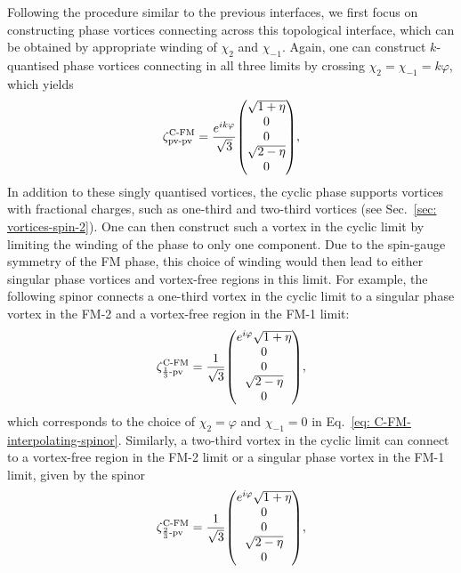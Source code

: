 Following the procedure similar to the previous interfaces, we first focus on
constructing phase vortices connecting across this topological interface, which
can be obtained by appropriate winding of \(\chi_2\) and \(\chi_{-1}\).
Again, one can construct \(k\)-quantised phase vortices connecting in all three
limits by crossing \(\chi_2 = \chi_{-1} = k\varphi \), which yields
\begin{align}\label{eq: C-FM-pv-pv}
    \zeta^\text{C-FM}_\text{pv-pv} = \frac{e^{ik\varphi}}{\sqrt{3}}\mqty(
        \sqrt{1 + \eta} \\
        0 \\
        0 \\
        \sqrt{2 - \eta} \\
        0
    ),
\end{align}
In addition to these singly quantised vortices, the cyclic phase supports
vortices with fractional charges, such as one-third and two-third vortices (see
Sec.~\ref{sec: vortices-spin-2}).
One can then construct such a vortex in the cyclic limit by limiting the winding
of the phase to only one component.
Due to the spin-gauge symmetry of the FM phase, this choice of winding would
then lead to either singular phase vortices and vortex-free regions in this
limit.
For example, the following spinor connects a one-third vortex in the cyclic
limit to a singular phase vortex in the FM-2 and a vortex-free region in the
FM-1 limit:
\begin{align}\label{eq: C-FM-third-pv}
    \zeta^\text{C-FM}_{\frac{1}{3}\text{-pv}} = \frac{1}{\sqrt{3}}\mqty(
        e^{i\varphi}\sqrt{1 + \eta} \\
        0 \\
        0 \\
        \sqrt{2 - \eta} \\
        0
    ),
\end{align}
which corresponds to the choice of \(\chi_2 = \varphi \) and \(\chi_{-1} = 0\)
in Eq.~\eqref{eq: C-FM-interpolating-spinor}.
Similarly, a two-third vortex in the cyclic limit can connect to a vortex-free
region in the FM-2 limit or a singular phase vortex in the FM-1 limit, given by
the spinor
\begin{align}\label{eq: C-FM-2third-vf}
    \zeta^\text{C-FM}_{\frac{2}{3}\text{-pv}} = \frac{1}{\sqrt{3}}\mqty(
        e^{i\varphi}\sqrt{1 + \eta} \\
        0 \\
        0 \\
        \sqrt{2 - \eta} \\
        0
    ),
\end{align}
